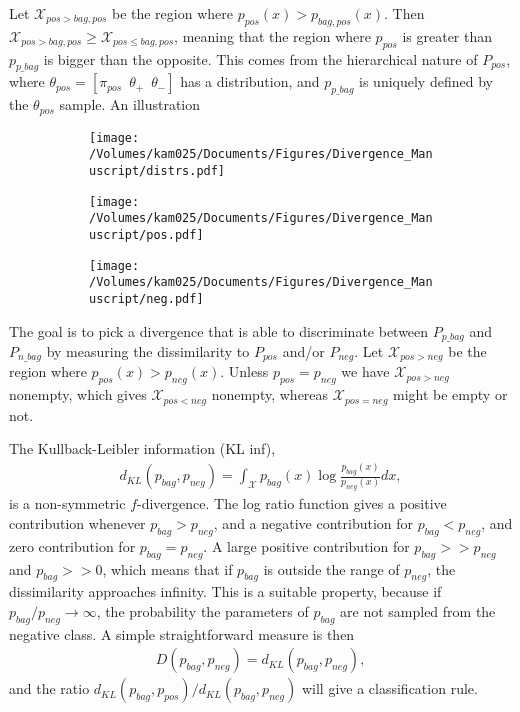 Let $\mathcal{X}_{pos>{bag,pos}}$ be the region where $p_{pos}(x)>p_{bag,pos}(x)$. 
Then $\mathcal{X}_{pos>{bag,pos}} \geq \mathcal{X}_{pos \leq {bag,pos}}$, 
meaning that the region where $p_{pos}$ is greater than $p_{p\_ bag}$ is bigger than the opposite. 
This comes from the hierarchical nature of $P_{pos}$, where $\theta_{pos} = [\pi_{pos} \,\,\,\theta_+ \,\,\,\theta_-]$ has a distribution, and $p_{p\_ bag}$ is uniquely defined by the $\theta_{pos}$ sample. 
An illustration
\begin{figure}[!h]
  \centering
  \begin{subfigure}{}
    \texttt{[image: /Volumes/kam025/Documents/Figures/Divergence\_Manuscript/distrs.pdf]}
  \end{subfigure}    
  \begin{subfigure}{}
    \texttt{[image: /Volumes/kam025/Documents/Figures/Divergence\_Manuscript/pos.pdf]}
  \end{subfigure}
  \begin{subfigure}{}
    \texttt{[image: /Volumes/kam025/Documents/Figures/Divergence\_Manuscript/neg.pdf]}
  \end{subfigure}
\end{figure}

The goal is to pick a divergence that is able to discriminate between $P_{p \_ bag}$ and $P_{n \_ bag}$ by measuring the dissimilarity to $P_{pos}$ and/or $P_{neg}$.
Let $\mathcal{X}_{pos > neg}$ be the region where $p_{pos}(x) > p_{neg}(x)$. 
Unless $p_{pos} = p_{neg}$ we have $\mathcal{X}_{pos > neg}$ nonempty, which gives $\mathcal{X}_{pos < neg}$ nonempty, whereas $\mathcal{X}_{pos = neg}$ might be empty or not. 

The Kullback-Leibler information (KL inf),
\begin{align}
  d_{KL}(p_{bag},p_{neg}) = \int_\mathcal{X} p_{bag}(x) \log \frac{p_{bag}(x)}{p_{neg}(x)} dx,
\end{align}
is a non-symmetric $f$-divergence.
The log ratio function gives a positive contribution whenever $p_{bag}>p_{neg}$, and a negative contribution for $p_{bag}<p_{neg}$, and zero contribution for $p_{bag} = p_{neg}$.
A large positive contribution for $p_{bag} >> p_{neg}$ and $p_{bag} >> 0$, which means that if $p_{bag}$ is outside the range of $p_{neg}$, the dissimilarity approaches infinity. 
This is a suitable property, because if $p_{bag}/p_{neg} \rightarrow \infty$, the probability the parameters of $p_{bag}$ are not sampled from the negative class. 
A simple straightforward measure is then
\begin{align}
  D(p_{bag},p_{neg}) = d_{KL} (p_{bag},p_{neg}),
\end{align}
and the ratio $d_{KL} (p_{bag},p_{pos})/d_{KL} (p_{bag},p_{neg})$ will give a classification rule.

